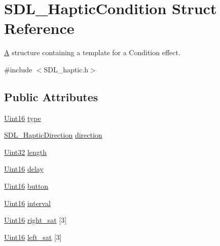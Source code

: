 \hypertarget{struct_s_d_l___haptic_condition}{}\section{S\+D\+L\+\_\+\+Haptic\+Condition Struct Reference}
\label{struct_s_d_l___haptic_condition}


\mbox{\hyperlink{struct_a}{A}} structure containing a template for a Condition effect.  




{\ttfamily \#include $<$S\+D\+L\+\_\+haptic.\+h$>$}

\subsection*{Public Attributes}
\begin{DoxyCompactItemize}
\item 
\mbox{\hyperlink{_s_d_l__stdinc_8h_a31fcc0a076c9068668173ee26d33e42b}{Uint16}} \mbox{\hyperlink{struct_s_d_l___haptic_condition_a7be55a9a86c05dd1a54a3006781cfa6f}{type}}
\item 
\mbox{\hyperlink{struct_s_d_l___haptic_direction}{S\+D\+L\+\_\+\+Haptic\+Direction}} \mbox{\hyperlink{struct_s_d_l___haptic_condition_a728507d30d18998949313de3a25e5581}{direction}}
\item 
\mbox{\hyperlink{_s_d_l__stdinc_8h_add440eff171ea5f55cb00c4a9ab8672d}{Uint32}} \mbox{\hyperlink{struct_s_d_l___haptic_condition_ad0efb0a6ddc20f058e87199eaaa95978}{length}}
\item 
\mbox{\hyperlink{_s_d_l__stdinc_8h_a31fcc0a076c9068668173ee26d33e42b}{Uint16}} \mbox{\hyperlink{struct_s_d_l___haptic_condition_aad40417980530ca8d80c62ba864a090b}{delay}}
\item 
\mbox{\hyperlink{_s_d_l__stdinc_8h_a31fcc0a076c9068668173ee26d33e42b}{Uint16}} \mbox{\hyperlink{struct_s_d_l___haptic_condition_acd35a9d432ad122bf7824b16974eac7a}{button}}
\item 
\mbox{\hyperlink{_s_d_l__stdinc_8h_a31fcc0a076c9068668173ee26d33e42b}{Uint16}} \mbox{\hyperlink{struct_s_d_l___haptic_condition_aafc182abea1078bed7e9cf5d0e713ea2}{interval}}
\item 
\mbox{\hyperlink{_s_d_l__stdinc_8h_a31fcc0a076c9068668173ee26d33e42b}{Uint16}} \mbox{\hyperlink{struct_s_d_l___haptic_condition_a90427a1e0d464b4b53abc1d419c97b2e}{right\+\_\+sat}} \mbox{[}3\mbox{]}
\item 
\mbox{\hyperlink{_s_d_l__stdinc_8h_a31fcc0a076c9068668173ee26d33e42b}{Uint16}} \mbox{\hyperlink{struct_s_d_l___haptic_condition_a953448774c40818a4f47c6efea21124d}{left\+\_\+sat}} \mbox{[}3\mbox{]}

\end{DoxyCompactItemize}
